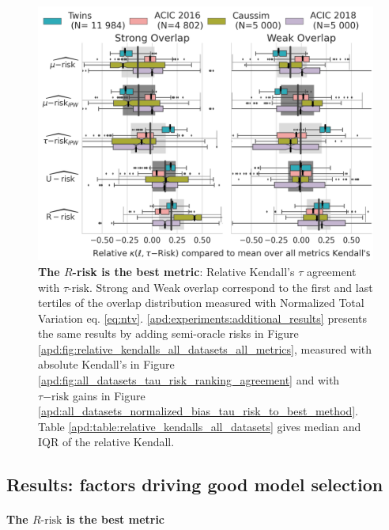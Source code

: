 \documentclass{report}
\begin{document}
\begin{figure}[!b]
  \centering
  \includegraphics[width=0.9\linewidth]{img/chapter_5/_1_r_risk_domination_r_risk_domination__ref_metric_mean_risks_by_Dataset_feasible_only.png}
  \caption{\textbf{The $R$-risk is the best metric}: Relative Kendall's $\tau$ agreement with $\tau\text{-risk}$.
    Strong and Weak overlap correspond to the first and last tertiles of the overlap distribution measured with
    Normalized Total Variation eq. \ref{eq:ntv}. \ref{apd:experiments:additional_results} presents the same results
    by adding semi-oracle risks in Figure \ref{apd:fig:relative_kendalls_all_datasets_all_metrics}, measured with
    absolute Kendall's in Figure \ref{apd:fig:all_datasets_tau_risk_ranking_agreement} and with $\tau\mathrm{-risk}$
    gains in Figure \ref{apd:all_datasets_normalized_bias_tau_risk_to_best_method}. Table
    \ref{apd:table:relative_kendalls_all_datasets} gives median and
    IQR of the relative Kendall.}\label{fig:relative_kendalls_all_datasets}
\end{figure}

\subsection{Results: factors driving good model selection}%
\label{subsec:causal_model_selection:empirical_results}%

\paragraph{The $R\text{-risk}$ is the best metric}
\end{document}
